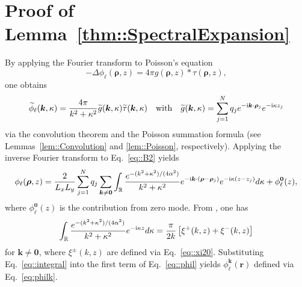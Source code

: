 \section{Proof of Lemma~\ref{thm::SpectralExpansion}}\label{app::deriv}
By applying the Fourier transform to Poisson's equation
\begin{equation}\label{eq::B.1}
	-\Delta\phi_{\ell}(\bm{\rho},z)=4\pi g(\bm{\rho},z)\ast\tau(\bm{\rho},z),
\end{equation}
one obtains  
\begin{equation}\label{eq::B2}
	\widetilde{\phi}_{\ell}(\bm{k},\kappa)=\frac{4\pi}{k^2+\kappa^2}\widetilde{g}(\bm{k},\kappa)\widetilde{\tau}(\bm{k},\kappa)\quad\text{with}\quad \widetilde{g}(\bm{k},\kappa)=\sum_{j=1}^{N}q_{j} e^{-\mathrm{i} \bm{k}\cdot\bm{\rho}_{j}}e^{-\mathrm{i} \kappa z_{j}}
\end{equation}
via the convolution theorem and the Poisson summation formula (see Lemmas~\ref{lem::Convolution} and \ref{lem::Poisson}, respectively). Applying the inverse Fourier transform to Eq.~\eqref{eq::B2} yields
\begin{equation}\label{eq::phil}
	\phi_{\ell}(\bm{\rho},z)=\frac{2}{L_xL_y}\sum_{j=1}^{N}q_{j}\sum_{\bm{k}\neq\bm{0}}\int_{\mathbb{R}}\frac{e^{-(k^2+\kappa^2)/(4\alpha^2)}}{k^2+\kappa^2}e^{-\mathrm{i} \bm{k}\cdot(\bm{\rho}-\bm{\rho}_{j})}e^{-\mathrm{i} \kappa(z-z_{j})}d\kappa + \phi^{\bm{0}}_{\ell}(z),
\end{equation}
where $\phi^{\bm{0}}_{\ell}(z)$ is the contribution from zero mode. From \cite{oberhettinger2012tables}, one has 
\begin{equation}\label{eq::integral}
	\int_{\mathbb{R}} \frac{e^{-(k^2+\kappa^2)/(4\alpha^2)}}{k^2+\kappa^2} e^{-\mathrm{i} \kappa z} d\kappa = \frac{\pi}{2k} \left[\xi^{+}(k,z)+\xi^{-}(k,z)\right]
\end{equation}
for $\bm{k}\neq\bm{0}$, where $\xi^{\pm}(k,z)$ are defined via Eq.~\eqref{eq::xi20}. Substituting Eq.~\eqref{eq::integral} into the first term of Eq.~\eqref{eq::phil} yields $\phi_{\ell}^{\bm{k}}(\bm{r})$ defined via Eq.~\eqref{eq:philk}.

